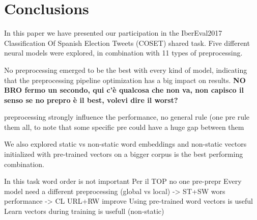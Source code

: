 \section{Conclusions} \label{sec:conclusion}

In this paper we have presented our participation in the IberEval2017 Classification Of Spanish Election Tweets (COSET) shared task. Five different neural models were explored, in combination with 11 types of preprocessing.


No preprocessing emerged to be the best with every kind of model, indicating that the preprocessing pipeline optimization has a big impact on results. \textbf{NO BRO fermo un secondo, qui c'è qualcosa che non va, non capisco il senso se no prepro è il best, volevi dire il worst?}

preprocessing strongly influence the performance, no general rule (one pre rule them all, to note that some specific pre could have a huge gap between them 

We also explored static vs non-static word embeddings and non-static vectors initialized with pre-trained vectors on a bigger corpus is the best performing combination.

In this task word order is not important  
Per il TOP no one pre-prepr Every model need a different preprocessing (global vs local)
-> ST+SW wors performance
-> CL URL+RW improve
Using pre-trained word vectors is useful  
Learn vectors during training is usefull (non-static)
